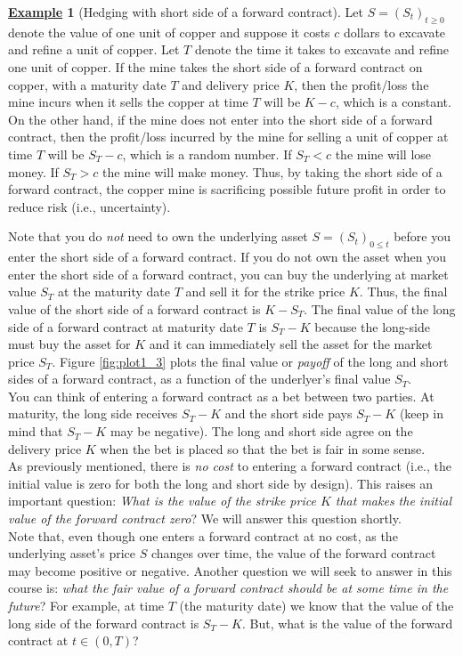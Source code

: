 \documentclass[12pt]{book}
\numberwithin{equation}{chapter}
\theoremstyle{plain}
\numberwithin{theorem}{section}
\theoremstyle{definition}
\newtheorem{example}[theorem]{\underline{Example}}
\numberwithin{exercise}{chapter}
\newcommand{\<}{\langle}
\renewcommand{\>}{\rangle}
\renewcommand{\(}{\left(}
\renewcommand{\)}{\right)}
\renewcommand{\[}{\left[}
\renewcommand{\]}{\right]}
\theoremstyle{definition}
\numberwithin{question}{section}
\begin{document}
\begin{example}[Hedging with short side of a forward contract]
\label{ex:copper_mine_1}
Let $S = (S_t)_{t \geq 0}$ denote the value of one unit of copper and suppose it costs $c$ dollars to excavate and refine a unit of copper.
Let $T$ denote the time it takes to excavate and refine one unit of copper.
If the mine takes the short side of a forward contract on copper, with a maturity date $T$ and delivery price $K$, then the profit/loss the mine incurs when it sells the copper at time $T$ will be $K - c$, which is a constant.
On the other hand, if the mine does not enter into the short side of a forward contract, then the profit/loss incurred by the mine for selling a unit of copper at time $T$ will be $S_T - c$, which is a random number.  If $S_T < c$ the mine will lose money.  If $S_T > c$ the mine will make money. 
Thus, by taking the short side of a forward contract, the copper mine is sacrificing possible future profit in order to reduce risk (i.e., uncertainty).
\end{example}

\noindent
Note that you do \textit{not} need to own the underlying asset $S = (S_t)_{0 \leq t}$ before you enter the short side of a forward contract. 
If you do not own the asset when you enter the short side of a forward contract, you can buy the underlying at market value $S_T$ at the maturity date $T$ and sell it for the strike price $K$.  Thus, the final value of the short side of a forward contract is $K - S_T$.  The final value of the long side of a forward contract at maturity date $T$ is $S_T - K$ because the long-side must buy the asset for $K$ and it can immediately sell the asset for the market price $S_T$.  Figure \ref{fig:plot1_3} plots the final value or \textit{payoff} of the long and short sides of a forward contract, as a function of the underlyer's final value $S_T$.
\\[0.5em]
You can think of entering a forward contract as a bet between two parties.  At maturity, the long side receives $S_T - K$ and the short side pays $S_T - K$ (keep in mind that $S_T - K$ may be negative).  The long and short side agree on the delivery price $K$ when the bet is placed so that the bet is fair in some sense.
\\[0.5em]
As previously mentioned, there is \textit{no cost} to entering a forward contract (i.e., the initial value is zero for both the long and short side by design).  
This raises an important question: \textit{What is the value of the strike price $K$ that makes the initial value of the forward contract zero}?  
We will answer this question shortly.
\\[0.5em]
Note that, even though one enters a forward contract at no cost, as the underlying asset's price $S$ changes over time, the value of the forward contract may become positive or negative.  Another question we will seek to answer in this course is: \textit{what the fair value of a forward contract should be at some time in the future}?  For example, at time $T$ (the maturity date) we know that the value of the long side of the forward contract is $S_T - K$.  But, what is the value of the forward contract at $t \in (0,T)$?
\end{document}
